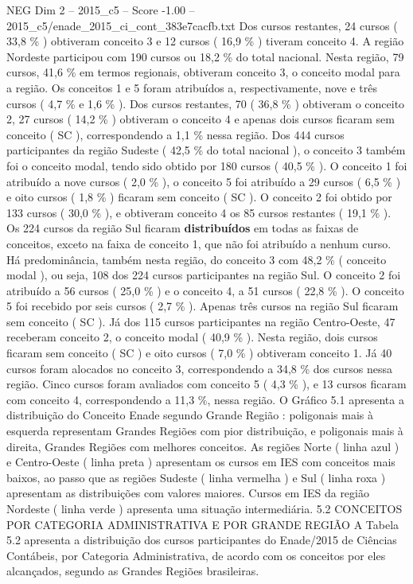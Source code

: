 \begin{textsample}{NEG Dim 2 – 2015\_c5 – Score -1.00 – 2015\_c5/enade\_2015\_ci\_cont\_383e7cacfb.txt}
Dos cursos restantes, 24 cursos ( 33,8 \% ) obtiveram conceito 3 e 12 cursos ( 16,9 \% ) tiveram conceito 4.
A região Nordeste participou com 190 cursos ou 18,2 \% do total nacional.
Nesta região, 79 cursos, 41,6 \% em termos regionais, obtiveram conceito 3, o conceito modal para a região.
Os conceitos 1 e 5 foram atribuídos a, respectivamente, nove e três cursos ( 4,7 \% e 1,6 \% ).
Dos cursos restantes, 70 ( 36,8 \% ) obtiveram o conceito 2, 27 cursos ( 14,2 \% ) obtiveram o conceito 4 e apenas dois cursos ficaram sem conceito ( SC ), correspondendo a 1,1 \% nessa região.
Dos 444 cursos participantes da região Sudeste ( 42,5 \% do total nacional ), o conceito 3 também foi o conceito modal, tendo sido obtido por 180 cursos ( 40,5 \% ).
O conceito 1 foi atribuído a nove cursos ( 2,0 \% ), o conceito 5 foi atribuído a 29 cursos ( 6,5 \% ) e oito cursos ( 1,8 \% ) ficaram sem conceito ( SC ).
O conceito 2 foi obtido por 133 cursos ( 30,0 \% ), e obtiveram conceito 4 os 85 cursos restantes ( 19,1 \% ).
Os 224 cursos da região Sul ficaram \textbf{distribuídos} em todas as faixas de conceitos, exceto na faixa de conceito 1, que não foi atribuído a nenhum curso.
Há predominância, também nesta região, do conceito 3 com 48,2 \% ( conceito modal ), ou seja, 108 dos 224 cursos participantes na região Sul.
O conceito 2 foi atribuído a 56 cursos ( 25,0 \% ) e o conceito 4, a 51 cursos ( 22,8 \% ).
O conceito 5 foi recebido por seis cursos ( 2,7 \% ).
Apenas três cursos na região Sul ficaram sem conceito ( SC ).
Já dos 115 cursos participantes na região Centro-Oeste, 47 receberam conceito 2, o conceito modal ( 40,9 \% ).
Nesta região, dois cursos ficaram sem conceito ( SC ) e oito cursos ( 7,0 \% ) obtiveram conceito 1.
Já 40 cursos foram alocados no conceito 3, correspondendo a 34,8 \% dos cursos nessa região.
Cinco cursos foram avaliados com conceito 5 ( 4,3 \% ), e 13 cursos ficaram com conceito 4, correspondendo a 11,3 \%, nessa região.
O Gráfico 5.1 apresenta a distribuição do Conceito Enade segundo Grande Região : poligonais mais à esquerda representam Grandes Regiões com pior distribuição, e poligonais mais à direita, Grandes Regiões com melhores conceitos.
As regiões Norte ( linha azul ) e Centro-Oeste ( linha preta ) apresentam os cursos em IES com conceitos mais baixos, ao passo que as regiões Sudeste ( linha vermelha ) e Sul ( linha roxa ) apresentam as distribuições com valores maiores.
Cursos em IES da região Nordeste ( linha verde ) apresenta uma situação intermediária. 5.2 CONCEITOS POR CATEGORIA ADMINISTRATIVA E POR GRANDE REGIÃO A Tabela 5.2 apresenta a distribuição dos cursos participantes do Enade/2015 de Ciências Contábeis, por Categoria Administrativa, de acordo com os conceitos por eles alcançados, segundo as Grandes Regiões brasileiras.

\end{textsample}
